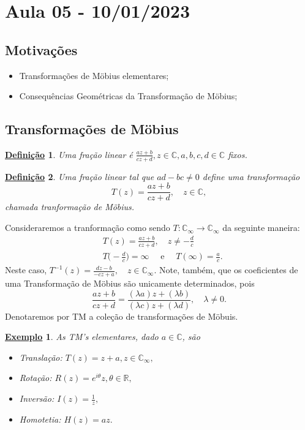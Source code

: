 \documentclass{article}
\newtheorem*{def*}{\underline{Defini\c c\~ao}}
\newtheorem{example}{\underline{Exemplo}}[section]
\begin{document}
  \section{Aula 05 - 10/01/2023}
  \subsection{Motiva\c c\~oes}
  \begin{itemize}
    \item Transforma\c c\~oes de M\"{o}bius elementares;
    \item Consequ\^encias Geom\'etricas da Transforma\c c\~ao de M\"{o}bius;
  \end{itemize}
  \subsection{Transforma\c c\~oes de M\"{o}bius}
  \begin{def*}
    Uma fra\c c\~ao linear \'e $\frac{az + b}{cz + d}, z\in \mathbb{C}, a, b, c, d\in \mathbb{C}$ fixos.
  \end{def*}
  \begin{def*}
    Uma fra\c c\~ao linear tal que $ad-bc\neq0$ define uma transforma\c c\~ao
    $$
    T(z) = \frac{az + b}{cz + d}, \quad z\in \mathbb{C},
    $$
    chamada tranforma\c c\~ao de M\"{o}bius.
  \end{def*}
  Consideraremos a tranforma\c c\~ao como sendo $T:\mathbb{C}_{\infty}\rightarrow \mathbb{C}_{\infty}$ da seguinte
  maneira:
  \begin{align*}
&T(z) = \frac{az + b}{cz + d}, \quad z\neq -\frac{d}{c} \\
&T\biggl(-\frac{d}{c}\biggr) = \infty \quad\text{ e }\quad T(\infty) = \frac{a}{c}.
  \end{align*}
  Neste caso, $T ^{-1}(z) = \displaystyle\frac{dz - b}{-cz + a}, \quad z\in \mathbb{C}_{\infty}.$ Note, tamb\'em, que os coeficientes
  de uma Transforma\c c\~ao de M\"{o}bius s\~ao unicamente determinados, pois 
  $$
  \frac{az + b}{cz + d} = \frac{(\lambda a)z + (\lambda b)}{(\lambda c)z + (\lambda d)}, \quad \lambda\neq0.
  $$
  Denotaremos por TM a cole\c c\~ao de transforma\c c\~oes de M\"{o}buis.
  \begin{example}
    As TM's elementares, dado $a\in \mathbb{C}$, s\~ao
    \begin{itemize}
      \item[-] Transla\c c\~ao: $T(z) = z + a, z\in \mathbb{C}_{\infty},$
      \item[-] Rota\c c\~ao: $R(z) = e^{i \theta}z, \theta\in \mathbb{R},$
      \item[-] Invers\~ao: $I(z) = \frac{1}{z},$
      \item[-] Homotetia: $H(z) = az.$
    \end{itemize}
  \end{example}
\end{document}
